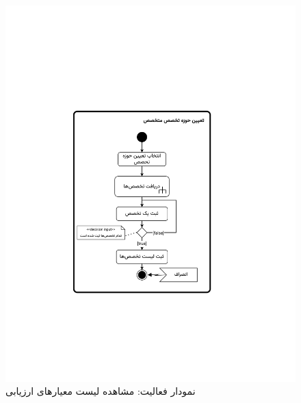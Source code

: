 \begin{figure}[ht!]
	\centering
	\includegraphics[scale=0.8, page=8]{figs/OOD-activity21-30.pdf}
	\caption{نمودار فعالیت: مشاهده لیست معیارهای ارزیابی}
\end{figure}
\FloatBarrier
\newpage


